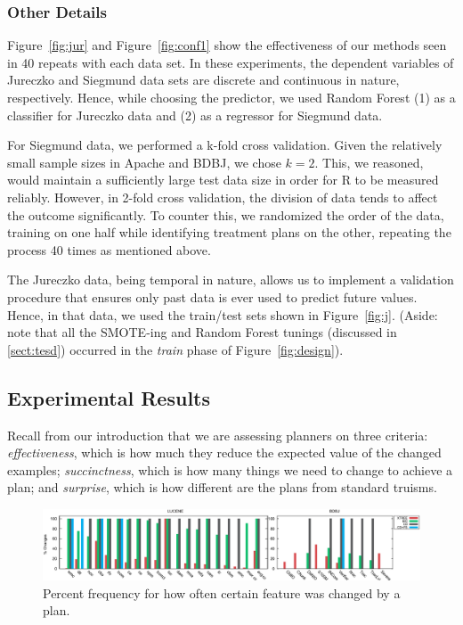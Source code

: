 \documentclass{sig-alternate}
\newcommand{\tion}[1]{\textsection\ref{sect:#1}}
\newcommand{\fig}[1]{Figure~\ref{fig:#1}}
\begin{document}
\subsubsection{Other Details}
 
\fig{jur} and \fig{conf1} show the effectiveness of our methods seen in 40 repeats with each data set.
In these experiments,   the dependent variables of Jureczko and Siegmund data sets are discrete and continuous in nature, respectively. Hence, while choosing the predictor, we used Random Forest (1) as a classifier for Jureczko data and (2) as a regressor for Siegmund data.

For Siegmund data, we performed a k-fold cross validation. Given the relatively small sample sizes in Apache and BDBJ, we chose $k=2$. This, we reasoned, would maintain a sufficiently large test data size in order for R to be measured reliably. However, in 2-fold cross validation, the division of data tends to affect the outcome significantly. To counter this, we randomized the order of the data, training on one half while identifying treatment plans on the other, repeating the process 40 times as mentioned above.

The Jureczko data, being temporal in nature, allows us
to implement a validation procedure that ensures only past data is ever used to
predict future values. Hence, in that data, we used the train/test sets shown in \fig{j}. 
(Aside: note  that all the SMOTE-ing and Random Forest tunings (discussed in \tion{tesd}) occurred in the {\em train} phase of \fig{design}).

\subsection{Experimental Results}

Recall from our introduction that we are assessing planners on three criteria:
{\em effectiveness}, which is how much they reduce the expected value of the changed examples;
{\em succinctness}, which is how many things we need to change to achieve a plan;
and {\em surprise}, which is how different are the plans from standard truisms.




\begin{figure}[!t]
\centering
\includegraphics[width=\linewidth]{figs/Deltas-both.eps}
\caption{Percent frequency for how often certain feature was changed by a plan.}\label{fig:changed}
\end{figure}
\end{document}
